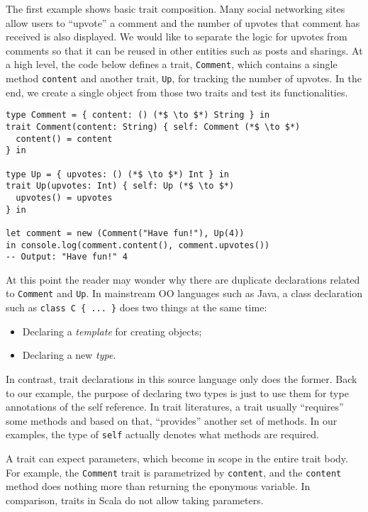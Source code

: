 The first example shows basic trait composition. Many social networking sites
allow users to ``upvote'' a comment and the number of upvotes that comment has
received is also displayed. We would like to separate the logic for upvotes from
comments so that it can be reused in other entities such as posts and sharings.
At a high level, the code below defines a trait, \lstinline$Comment$, which
contains a single method \lstinline$content$ and another trait, \lstinline$Up$,
for tracking the number of upvotes. In the end, we create a single object from
those two traits and test its functionalities.

\begin{lstlisting}
type Comment = { content: () (*$ \to $*) String } in
trait Comment(content: String) { self: Comment (*$ \to $*)
  content() = content
} in

type Up = { upvotes: () (*$ \to $*) Int } in
trait Up(upvotes: Int) { self: Up (*$ \to $*)
  upvotes() = upvotes
} in

let comment = new (Comment("Have fun!"), Up(4))
in console.log(comment.content(), comment.upvotes())
-- Output: "Have fun!" 4
\end{lstlisting}

At this point the reader may wonder why there are duplicate declarations related
to \lstinline$Comment$ and \lstinline$Up$. In mainstream OO languages such as
Java, a class declaration such as \lstinline$class C { ... }$ does two things at
the same time:

\begin{itemize}
\item Declaring a \emph{template} for creating objects;
\item Declaring a new \emph{type}.
\end{itemize}

\noindent In contrast, trait declarations in this source language only does the
former. Back to our example, the purpose of declaring two types is just to use
them for type annotations of the self reference.  In trait literatures, a trait
usually ``requires'' some methods and based on that,  ``provides'' another set
of methods. In our examples, the type of \lstinline$self$ actually denotes what
methods are required.

A trait can expect parameters, which become in scope in the entire trait body.
For example, the \lstinline$Comment$ trait is parametrized by
\lstinline$content$, and the \lstinline$content$ method does nothing more than
returning the eponymous variable. In comparison, traits in Scala do not allow
taking parameters.

